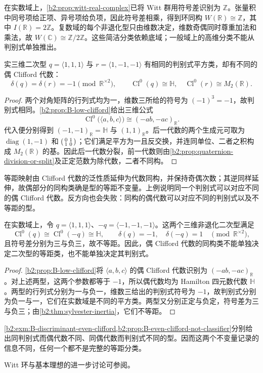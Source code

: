 在实数域上，\cref{b2:prop:witt-real-complex}已将 Witt 群用符号差识别为 \(\mathbb Z\)。张量积中同号项给正项、异号项给负项，因此符号差相乘，得到环同构 \(W(\mathbb R)\cong\mathbb Z\)，其中 \(I(\mathbb R)=2\mathbb Z\)。复数域的每个非退化型只由维数决定，维数奇偶同时尊重加法和乘法，故 \(W(\mathbb C)\cong\mathbb Z/2\mathbb Z\)。这些简洁分类依赖底域；一般域上的高维分类不能从判别式单独推出。

\begin{example}\label{b2:exm:B-discriminant-even-clifford}
	实三维二次型 \(q=\langle1,1,1\rangle\) 与 \(r=\langle1,-1,-1\rangle\) 有相同的判别式平方类，却有不同的偶 Clifford 代数：
	\[
		\delta(q)=\delta(r)=-1\pmod{\mathbb R^{\times2}},\qquad \operatorname{Cl}^0(q)\cong\mathbb H,\quad \operatorname{Cl}^0(r)\cong M_2(\mathbb R).
	\]
\end{example}
\begin{proof}
	两个对角矩阵的行列式均为一，维数三所给的符号为 \((-1)^3=-1\)，故判别式相同。\cref{b2:prop:B-low-clifford}给出三维公式
	\[
		\operatorname{Cl}^0\bigl(\langle a,b,c\rangle\bigr) \cong(-ab,-ac)_{\mathbb R}.
	\]
	代入便分别得到 \((-1,-1)_{\mathbb R}=\mathbb H\) 与 \((1,1)_{\mathbb R}\)。后一代数的两个生成元可取为 \(\operatorname{diag}(1,-1)\) 和 \(\begin{psmallmatrix}0&1\\1&0\end{psmallmatrix}\)；它们满足平方为一且反交换，并连同单位、二者之积构成 \(M_2(\mathbb R)\) 的基。因此后一代数分裂，前一代数则由\cref{b2:prop:quaternion-division-or-split}及正定范数为除代数，二者不同构。
\end{proof}

等距映射由 Clifford 代数的泛性质延伸为代数同构，并保持奇偶次数；其逆同样延伸，故偶部分的同构类确是型的等距不变量。上例说明同一个判别式可以对应不同的偶 Clifford 代数。反方向也会失败：同构的偶代数可以对应不同的判别式以及不等距的型。

\begin{proposition}\label{b2:prop:B-even-clifford-not-classifier}
	在实数域上，令 \(q=\langle1,1,1\rangle\)、\(-q=\langle-1,-1,-1\rangle\)。这两个三维非退化二次型满足
	\[
		\operatorname{Cl}^0(q)\cong\operatorname{Cl}^0(-q)\cong\mathbb H, \qquad \delta(q)=-1,\quad\delta(-q)=1 \quad\pmod{\mathbb R^{\times2}},
	\]
	且符号差分别为三与负三，故不等距。因此，偶 Clifford 代数的同构类不能单独决定二次型的等距类，也不能单独决定其判别式。
\end{proposition}
\begin{proof}
	\cref{b2:prop:B-low-clifford}将 \(\langle a,b,c\rangle\) 的偶 Clifford 代数识别为 \((-ab,-ac)_{\mathbb R}\)。对上述两型，这两个参数都等于 \(-1\)，所以偶代数均为 Hamilton 四元数代数 \(\mathbb H\)。两型的行列式分别为一与负一，维数三给出的判别式符号为 \(-1\)，故判别式分别为负一与一，它们在实数域是不同的平方类。两型又分别正定与负定，符号差为三与负三；由\cref{b2:thm:sylvester-inertia}，它们不等距。
\end{proof}

\cref{b2:exm:B-discriminant-even-clifford,b2:prop:B-even-clifford-not-classifier}分别给出同判别式而偶代数不同、同偶代数而判别式不同的型。因而这两个不变量记录的信息不同，任何一个都不是完整的等距分类。

\ProseParagraphBreak
Witt 环与基本理想的进一步讨论可参阅\cite[Chapter ``Introduction to Witt rings'']{Lam2005QuadraticForms}。
